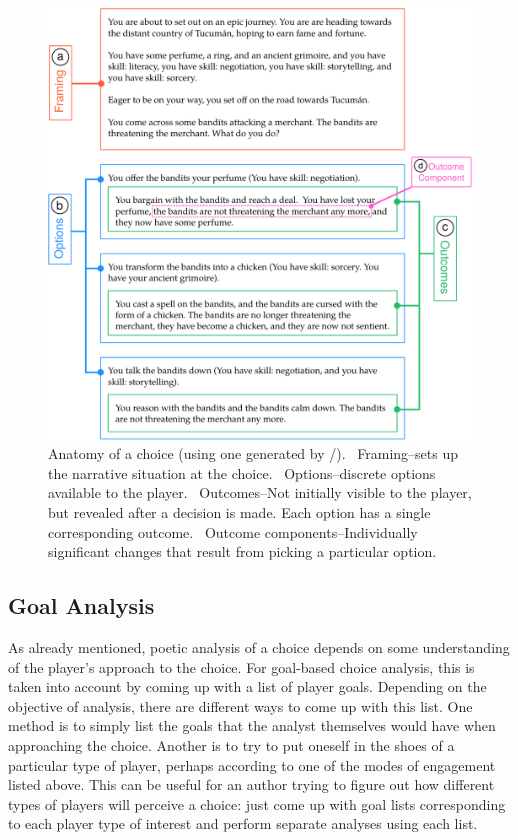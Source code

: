 \begin{figure}[!p]
\centering
\includegraphics[width=\textwidth]{fig/choice-anatomy-crop.pdf}
\caption[Anatomy of a choice]{%
Anatomy of a choice (using one generated by \dunyazad/). ~Framing--sets up the narrative situation at the choice. ~Options--discrete options available to the player. ~Outcomes--Not initially visible to the player, but revealed after a decision is made. Each option has a single corresponding outcome. ~Outcome components--Individually significant changes that result from picking a particular option.}
\label{fig:choice-anatomy}
\end{figure}


\subsection{Goal Analysis}

As already mentioned, poetic analysis of a choice depends on some understanding of the player's approach to the choice.
%
For goal-based choice analysis, this is taken into account by coming up with a list of player goals.
%
Depending on the objective of analysis, there are different ways to come up with this list.
%
One method is to simply list the goals that the analyst themselves would have when approaching the choice.
%
Another is to try to put oneself in the shoes of a particular type of player, perhaps according to one of the modes of engagement listed above.
%
This can be useful for an author trying to figure out how different types of players will perceive a choice: just come up with goal lists corresponding to each player type of interest and perform separate analyses using each list.


